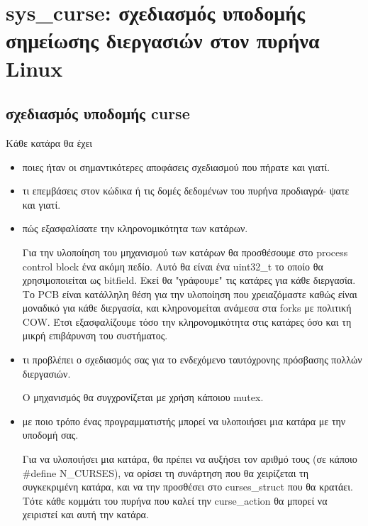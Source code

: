 \documentclass[a4paper,10pt]{article} \usepackage{anysize}
\begin{document}
\renewcommand{\theenumi}{\roman{enumi}}


\section*{sys\_curse: σχεδιασμός υποδομής σημείωσης διεργασιών στον πυρήνα Linux}
\subsection*{σχεδιασμός υποδομής curse}
Κάθε κατάρα θα έχει
\begin{itemize}
    \item ποιες ήταν οι σημαντικότερες αποφάσεις σχεδιασμού που πήρατε και γιατί.

        

    \item τι επεμβάσεις στον κώδικα ή τις δομές δεδομένων του πυρήνα προδιαγρά-
        ψατε και γιατί.
        

    \item πώς εξασφαλίσατε την κληρονομικότητα των κατάρων.

        Για την υλοποίηση του μηχανισμού των κατάρων θα προσθέσουμε στο
        process control block ένα ακόμη πεδίο. Αυτό θα είναι ένα uint32\_t το
        οποίο θα χρησιμοποιείται ως bitfield. Εκεί θα "γράφουμε" τις κατάρες
        για κάθε διεργασία. Το PCB είναι κατάλληλη θέση για την υλοποίηση που
        χρειαζόμαστε καθώς είναι μοναδικό για κάθε διεργασία, και
        κληρονομείται ανάμεσα στα forks με πολιτική COW. Έτσι εξασφαλίζουμε
        τόσο την κληρονομικότητα στις κατάρες όσο και τη μικρή επιβάρυνση του
        συστήματος.

    \item τι προβλέπει ο σχεδιασμός σας για το ενδεχόμενο ταυτόχρονης πρόσβασης
        πολλών διεργασιών.

        Ο μηχανισμός θα συγχρονίζεται με χρήση κάποιου mutex.

    \item με ποιο τρόπο ένας προγραμματιστής μπορεί να υλοποιήσει μια κατάρα με
        την υποδομή σας.

        Για να υλοποιήσει μια κατάρα, θα πρέπει να αυξήσει τον αριθμό τους
        (σε κάποιο \#define N\_CURSES), να ορίσει τη συνάρτηση που θα χειρίζεται
        τη συγκεκριμένη κατάρα, και να την προσθέσει στο curses\_struct που θα
        κρατάει. Τότε κάθε κομμάτι του πυρήνα που καλεί την curse\_action θα
        μπορεί να χειριστεί και αυτή την κατάρα. 


\end{itemize}
\end{document}
